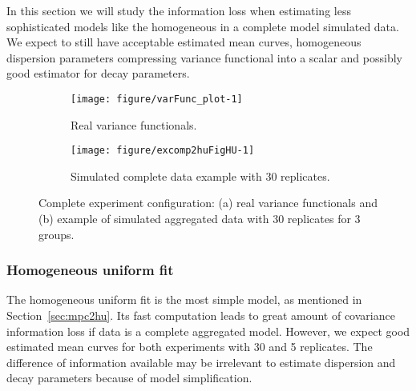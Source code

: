 In this section we will study the information loss when estimating less sophisticated models like the homogeneous in a complete model simulated data. We expect to still have acceptable estimated mean  curves, homogeneous dispersion parameters compressing variance functional into a scalar and possibly good estimator for decay parameters.


\begin{figure}[!t]
  \begin{subfigure}{\textwidth}
    \centering
\begin{knitrout}
\color{fgcolor}
\texttt{[image: figure/varFunc\_plot-1]} 

\end{knitrout}
    \caption{Real variance functionals.} \label{fig:varfunc-simu}
  \end{subfigure}
  \begin{subfigure}{\textwidth}
    \centering
\begin{knitrout}
\color{fgcolor}
\texttt{[image: figure/excomp2huFigHU-1]} 

\end{knitrout}
    \caption{Simulated complete data example with 30 replicates.}
  \end{subfigure}
  \caption{Complete experiment configuration: (a) real variance functionals and (b) example of simulated aggregated data with 30 replicates for 3 groups.}
  \label{fig:comp-data}
\end{figure}




\subsubsection{Homogeneous uniform fit}
\label{sec:comp2hu}



The homogeneous uniform fit is the most simple model, as mentioned in Section~\ref{sec:mpc2hu}. Its fast computation leads to great amount of covariance information loss if data is a complete aggregated model. However, we expect good estimated mean curves for both experiments with 30 and 5 replicates. The difference of information available may be irrelevant to estimate dispersion and decay parameters because of model simplification.

